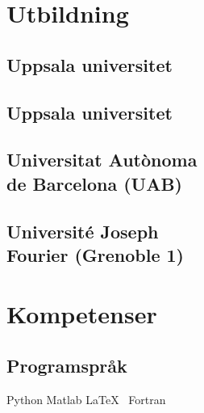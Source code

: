 \documentclass[]{gironslopez-resume-se}
\begin{document}
  \begin{minipage}[t]{0.33\textwidth}

    \section{Utbildning}

    \subsection{Uppsala universitet}

    \sectionsep

    \subsection{Uppsala universitet}

    \sectionsep

    \subsection[]{Universitat Autònoma \\ de Barcelona (UAB)}

    \sectionsep

    \subsection[]{Université Joseph \\ Fourier (Grenoble 1)}

    \sectionsep

    \section{Kompetenser}

    \subsection{Programspråk}
    Python \textbullet{} Matlab \textbullet{} \LaTeX\ \textbullet{} Fortran

    \sectionsep


\end{minipage}
\end{document}
